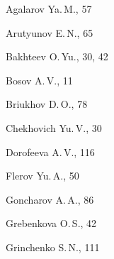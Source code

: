 \begin{theindex}





  \item Agalarov Ya.\,M., 57


  \item Arutyunov E.\,N., 65





  \indexspace





  \item Bakhteev O.\,Yu., 30, 42


  \item Bosov A.\,V., 11


  \item Briukhov D.\,O., 78





  \indexspace





  \item Chekhovich Yu.\,V., 30





  \indexspace





  \item Dorofeeva A.\,V., 116





  \indexspace





  \item Flerov Yu.\,A., 50





  \indexspace





  \item Goncharov A.\,A., 86


  \item Grebenkova O.\,S., 42


  \item Grinchenko S.\,N., 111





  \indexspace






\end{theindex}
